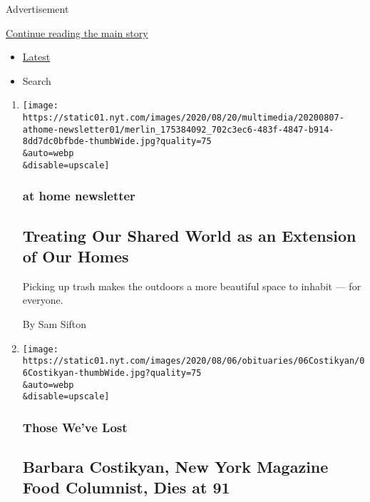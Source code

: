 Advertisement

\protect\hyperlink{after-mid1}{Continue reading the main story}

\begin{itemize}
\tightlist
\item
  \protect\hyperlink{stream-panel}{Latest}
\item
  Search
\end{itemize}

\begin{enumerate}
\def\labelenumi{\arabic{enumi}.}
\item
  \href{/2020/08/07/at-home/newsletter.html}{}

  \texttt{[image: https://static01.nyt.com/images/2020/08/20/multimedia/20200807-athome-newsletter01/merlin\_175384092\_702c3ec6-483f-4847-b914-8dd7dc0bfbde-thumbWide.jpg?quality=75\\\&auto=webp\\\&disable=upscale]}

  \hypertarget{at-home-newsletter}{%
  \subsubsection{at home newsletter}\label{at-home-newsletter}}

  \hypertarget{treating-our-shared-world-as-an-extension-of-our-homes}{%
  \subsection{Treating Our Shared World as an Extension of Our
  Homes}\label{treating-our-shared-world-as-an-extension-of-our-homes}}

  Picking up trash makes the outdoors a more beautiful space to inhabit
  --- for everyone.

  By Sam Sifton
\item
  \href{/2020/08/07/obituaries/barbara-costikyan-dead-coronavirus.html}{}

  \texttt{[image: https://static01.nyt.com/images/2020/08/06/obituaries/06Costikyan/06Costikyan-thumbWide.jpg?quality=75\\\&auto=webp\\\&disable=upscale]}

  \hypertarget{those-weve-lost}{%
  \subsubsection{Those We've Lost}\label{those-weve-lost}}

  \hypertarget{barbara-costikyan-new-york-magazine-food-columnist-dies-at-91}{%
  \subsection{Barbara Costikyan, New York Magazine Food Columnist, Dies
  at
  91}\label{barbara-costikyan-new-york-magazine-food-columnist-dies-at-91}}


\end{enumerate}
